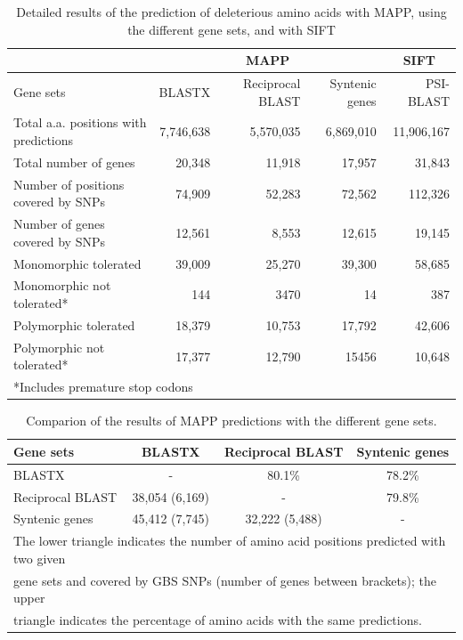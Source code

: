 \documentclass[12pt]{article}
\begin{document}
\begin{table}[ht]
{\fontsize{10}{10}\sf
\caption[]{Detailed results of the prediction of deleterious amino acids with MAPP, using the different gene sets, and with SIFT}
\begin{tabular}{lrrrr} \hline
\toprule
\multicolumn{1}{c}{}	&	\multicolumn{3}{c}{MAPP}	&	\multicolumn{1}{c}{SIFT}	\\	\hline
Gene sets  & BLASTX & Reciprocal BLAST & Syntenic genes	&	PSI-BLAST \\	 \hline\hline
Total a.a. positions with predictions 	& 7,746,638 &	5,570,035 &	6,869,010	&	11,906,167 \\
Total number of genes &	20,348 &	11,918 &	17,957	&	31,843	\\
Number of positions covered by SNPs &	74,909 &	52,283 &	72,562	&	112,326	\\
Number of genes covered by SNPs &	12,561	&	8,553	&	12,615	&	19,145	\\
Monomorphic tolerated &	39,009 &	25,270 &	39,300	&	58,685	\\
Monomorphic not tolerated* &	144 &	3470 &	14	&	387	\\
Polymorphic tolerated	& 18,379 &	10,753 &		17,792	&	42,606	\\
Polymorphic not tolerated* &	 17,377 &	12,790 &	15456	&	10,648	\\
\bottomrule
\multicolumn{5}{l}{*Includes premature stop codons}
\end{tabular}
\label{Predicitons} 
}
\end{table}


\begin{table}[ht]
  \begin{center}
    \caption[]{Comparion of the results of MAPP predictions with the different gene sets.} 
{\fontsize{10}{10}\sf
      \begin{tabular}{lccc}
\toprule
{Gene sets}		&	{      BLASTX      }	&	{      Reciprocal BLAST      }	&	{Syntenic genes}	\\ \hline \hline
BLASTX	&	-	&	80.1\%	&	78.2\%	\\
Reciprocal BLAST	&	38,054 (6,169)	&	-	&	79.8\%	\\
Syntenic genes		&	45,412 (7,745)	&	32,222 (5,488)	&	-	\\
\bottomrule
\multicolumn{4}{l}{The lower triangle indicates the number of  amino acid positions predicted with two given }	\\
\multicolumn{4}{l}{gene sets and covered by GBS SNPs (number of genes between brackets);  the upper }	\\
\multicolumn{4}{l}{triangle indicates the percentage of amino acids with the same predictions.}\\
      \end{tabular}
    \label{tableS2} 
}
  \end{center}
\end{table}
\end{document}
